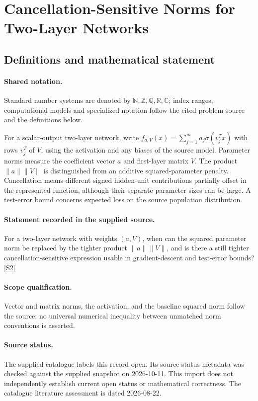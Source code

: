 \documentclass[11pt]{article}
\newcommand{\sref}[2]{\hyperlink{source:#1:#2}{[S#2]}}
\begin{document}
\section{Cancellation-Sensitive Norms for Two-Layer Networks}\label{statement}

\subsection{Definitions and mathematical statement}

\paragraph{Shared notation.}Standard number systems are denoted by $\mathbb N,\mathbb Z,\mathbb Q,\mathbb R,\mathbb C$; index ranges, computational models and specialized notation follow the cited problem source and the definitions below.


For a scalar-output two-layer network, write $f_{a,V}(x)=\sum_{j=1}^m a_j\sigma(v_j^Tx)$ with rows $v_j^T$ of $V$, using the activation and any biases of the source model. Parameter norms measure the coefficient vector $a$ and first-layer matrix $V$. The product $\lVert a\rVert\lVert V\rVert$ is distinguished from an additive squared-parameter penalty. Cancellation means different signed hidden-unit contributions partially offset in the represented function, although their separate parameter sizes can be large. A test-error bound concerns expected loss on the source population distribution.
\paragraph{Statement recorded in the supplied source.}
For a two-layer network with weights $(a,V)$, when can the squared parameter norm be replaced by the tighter product $\lVert a\rVert\lVert V\rVert$, and is there a still tighter cancellation-sensitive expression usable in gradient-descent and test-error bounds? \sref{statement}{2}
\paragraph{Scope qualification.}
Vector and matrix norms, the activation, and the baseline squared norm follow the source; no universal numerical inequality between unmatched norm conventions is asserted.
\paragraph{Source status.}
The supplied catalogue labels this record open. Its source-status metadata was checked against the supplied snapshot on 2026-10-11. This import does not independently establish current open status or mathematical correctness. The catalogue literature assessment is dated 2026-08-22.
\end{document}
